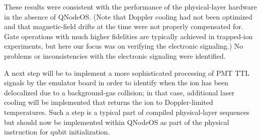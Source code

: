 These results were consistent with the performance of the physical-layer hardware in the absence of \ac{QNodeOS}. (Note that Doppler cooling had not been optimized and that magnetic-field drifts at the time were not properly compensated for. Gate operations with much higher fidelities are typically achieved in trapped-ion experiments, but here our focus was on verifying the electronic signaling.) No problems or inconsistencies with the electronic signaling were identified. 

A next step will be to implement a more sophisticated processing of \ac{PMT} \ac{TTL} signals by the emulator board in order to identify when the ion has been delocalized due to a background-gas collision; in that case, additional laser cooling will be implemented that returns the ion to Doppler-limited temperatures. Such a step is a typical part of compiled physical-layer sequences but should now be implemented within \ac{QNodeOS} as part of the physical instruction for qubit initialization.